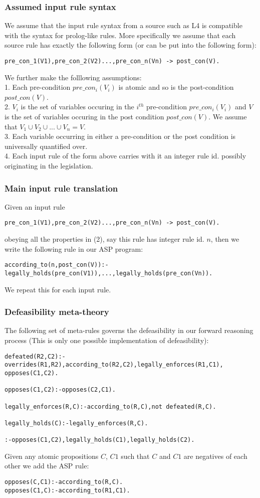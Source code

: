 \subsubsection{Assumed input rule syntax}
We assume that the input rule syntax from a source such as L4 is compatible with the syntax for prolog-like rules. More specifically we assume that each source rule has exactly the following form (or can be put into the following form):
\begin{verbatim}
pre_con_1(V1),pre_con_2(V2)...,pre_con_n(Vn) -> post_con(V).
\end{verbatim}
We further make the folllowing assumptions:\\
1. Each pre-condition $pre\_con_{i}(V_{i})$ is atomic and so is the post-condition $post\_con(V)$.\\
2. $V_{i}$ is the set of variables occuring in the $i^{th}$ pre-condition $pre\_con_{i}(V_{i})$ and $V$ is the set of variables occuring in the post condition $post\_con(V)$. We assume that $V_{1}\cup V_{2}\cup ... \cup V_{n} = V$.\\
3. Each variable occurring in either a pre-condition or the post condition is universally quantified over.\\
4. Each input rule of the form above carries with it an integer rule id. possibly originating in the legislation.
\subsubsection{Main input rule translation}
Given an input rule \begin{verbatim}
pre_con_1(V1),pre_con_2(V2)...,pre_con_n(Vn) -> post_con(V).
\end{verbatim} obeying all the properties in (2), say this rule has integer rule id. $n$, then we write the following rule in our ASP program: \begin{verbatim}
according_to(n,post_con(V)):-legally_holds(pre_con(V1)),...,legally_holds(pre_con(Vn)).    
\end{verbatim} 
We repeat this for each input rule.
\subsubsection{Defeasibility meta-theory}
The following set of meta-rules governs the defeasibility in our forward reasoning process (This is only one possible implementation of defeasibility):
\begin{verbatim}
defeated(R2,C2):-overrides(R1,R2),according_to(R2,C2),legally_enforces(R1,C1),
opposes(C1,C2).

opposes(C1,C2):-opposes(C2,C1).

legally_enforces(R,C):-according_to(R,C),not defeated(R,C).

legally_holds(C):-legally_enforces(R,C).

:-opposes(C1,C2),legally_holds(C1),legally_holds(C2). 
\end{verbatim}
Given any atomic propositions $C$, $C1$ such that $C$ and $C1$ are negatives of each other we add the ASP rule:
\begin{verbatim}
opposes(C,C1):-according_to(R,C).
opposes(C1,C):-according_to(R1,C1).
\end{verbatim}
